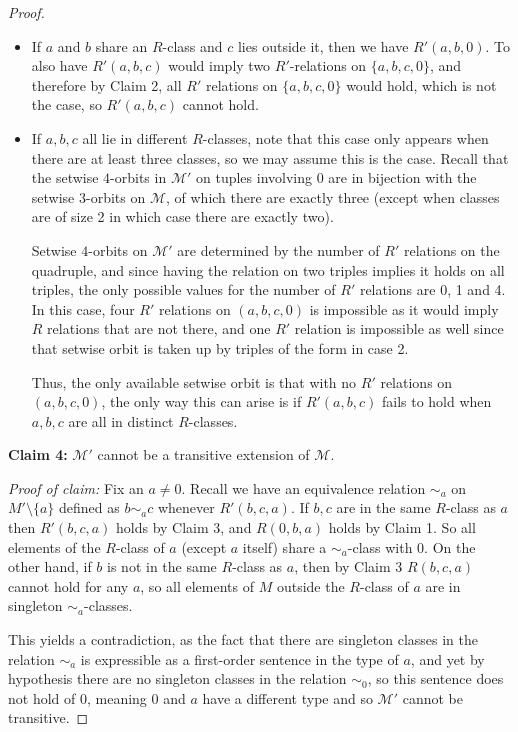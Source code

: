 \documentclass{amsart}
\newcommand{\set}[1]{\{#1 \}}
\newcommand{\model}{\mathcal{M}}
\begin{document}
\begin{proof}
\begin{itemize}
    \item If $a$ and $b$ share an $R$-class and $c$ lies outside it, then we have $R'(a,b,0)$. To also have $R'(a,b,c)$ would imply two $R'$-relations on $\set{a,b,c,0}$, and therefore by Claim 2, all $R'$ relations on $\set{a,b,c,0}$ would hold, which is not the case, so $R'(a,b,c)$ cannot hold.

    \item If $a,b,c$ all lie in different $R$-classes, note that this case only appears when there are at least three classes, so we may assume this is the case. Recall that the setwise $4$-orbits in $\model'$ on tuples involving 0 are in bijection with the setwise $3$-orbits on $\model$, of which there are exactly three (except when classes are of size 2 in which case there are exactly two).
    
    Setwise $4$-orbits on $\model'$ are determined by the number of $R'$ relations on the quadruple, and since having the relation on two triples implies it holds on all triples, the only possible values for the number of $R'$ relations are 0, 1 and 4. In this case, four $R'$ relations on $(a,b,c,0)$ is impossible as it would imply $R$ relations that are not there, and one $R'$ relation is impossible as well since that setwise orbit is taken up by triples of the form in case 2.
    
    Thus, the only available setwise orbit is that with no $R'$ relations on $(a,b,c, 0)$, the only way this can arise is if $R'(a,b,c)$ fails to hold when $a,b,c$ are all in distinct $R$-classes.
    \end{itemize}

    \textbf{Claim 4:} $\model'$ cannot be a transitive extension of $\model$.

    \textit{Proof of claim:} Fix an $a \neq 0$. Recall we have an equivalence relation $\sim_a$ on $M' \setminus \set{a}$ defined as $b\sim_a c$ whenever $R'(b,c,a)$. If $b,c$ are in the same $R$-class as $a$ then $R'(b,c,a)$ holds by Claim 3, and $R(0, b, a)$ holds by Claim 1. So all elements of the $R$-class of $a$ (except $a$ itself) share a $\sim_a$-class with $0$. On the other hand, if $b$ is not in the same $R$-class as $a$, then by Claim 3 $R(b,c,a)$ cannot hold for any $a$, so all elements of $M$ outside the $R$-class of $a$ are in singleton $\sim_a$-classes. 
    
    This yields a contradiction, as the fact that there are singleton classes in the relation $\sim_a$ is expressible as a first-order sentence in the type of $a$, and yet by hypothesis there are no singleton classes in the relation $\sim_0$, so this sentence does not hold of $0$, meaning $0$ and $a$ have a different type and so $\model'$ cannot be transitive.
    
\end{proof}
\end{document}
